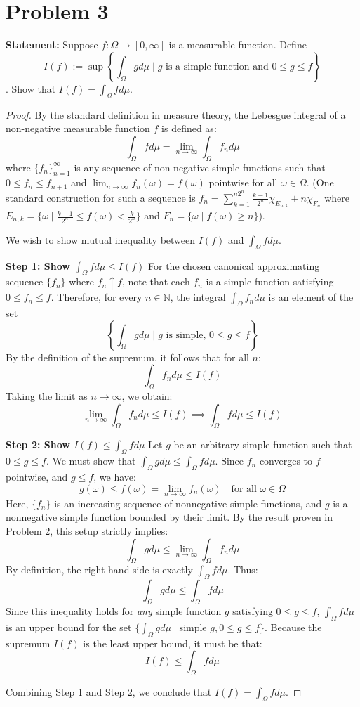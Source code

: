 \documentclass[12pt]{article}
\begin{document}
\section*{Problem 3}

\textbf{Statement:} Suppose $f: \Omega \rightarrow [0, \infty]$ is a measurable function. Define
$$ I(f) := \sup\left\{\int_{\Omega} g d\mu \mid g \text{ is a simple function and } 0 \le g \le f\right\} $$.
Show that $I(f) = \int_{\Omega} f d\mu$.

\begin{proof}
By the standard definition in measure theory, the Lebesgue integral of a non-negative measurable function $f$ is defined as:
$$ \int_{\Omega} f d\mu = \lim_{n \to \infty} \int_{\Omega} f_n d\mu $$
where $\{f_n\}_{n=1}^{\infty}$ is any sequence of non-negative simple functions such that $0 \le f_n \le f_{n+1}$ and $\lim_{n \to \infty} f_n(\omega) = f(\omega)$ pointwise for all $\omega \in \Omega$. 
(One standard construction for such a sequence is $f_n = \sum_{k=1}^{n 2^n} \frac{k-1}{2^n} \chi_{E_{n,k}} + n \chi_{F_n}$ where $E_{n,k} = \{ \omega \mid \frac{k-1}{2^n} \le f(\omega) < \frac{k}{2^n} \}$ and $F_n = \{ \omega \mid f(\omega) \ge n \}$).

We wish to show mutual inequality between $I(f)$ and $\int_{\Omega} f d\mu$.

\textbf{Step 1: Show $\int_{\Omega} f d\mu \le I(f)$}
For the chosen canonical approximating sequence $\{f_n\}$ where $f_n \uparrow f$, note that each $f_n$ is a simple function satisfying $0 \le f_n \le f$. 
Therefore, for every $n \in \mathbb{N}$, the integral $\int_{\Omega} f_n d\mu$ is an element of the set 
$$ \left\{ \int_{\Omega} g d\mu \mid g \text{ is simple, } 0 \le g \le f \right\} $$
By the definition of the supremum, it follows that for all $n$:
$$ \int_{\Omega} f_n d\mu \le I(f) $$
Taking the limit as $n \to \infty$, we obtain:
$$ \lim_{n \to \infty} \int_{\Omega} f_n d\mu \le I(f) \implies \int_{\Omega} f d\mu \le I(f) $$

\textbf{Step 2: Show $I(f) \le \int_{\Omega} f d\mu$}
Let $g$ be an arbitrary simple function such that $0 \le g \le f$. We must show that $\int_{\Omega} g d\mu \le \int_{\Omega} f d\mu$.
Since $f_n$ converges to $f$ pointwise, and $g \le f$, we have:
$$ g(\omega) \le f(\omega) = \lim_{n \to \infty} f_n(\omega) \quad \text{for all } \omega \in \Omega $$
Here, $\{f_n\}$ is an increasing sequence of nonnegative simple functions, and $g$ is a nonnegative simple function bounded by their limit. By the result proven in Problem 2, this setup strictly implies:
$$ \int_{\Omega} g d\mu \le \lim_{n \to \infty} \int_{\Omega} f_n d\mu $$
By definition, the right-hand side is exactly $\int_{\Omega} f d\mu$. Thus:
$$ \int_{\Omega} g d\mu \le \int_{\Omega} f d\mu $$
Since this inequality holds for \textit{any} simple function $g$ satisfying $0 \le g \le f$, $\int_{\Omega} f d\mu$ is an upper bound for the set $\{ \int_{\Omega} g d\mu \mid \text{simple } g, 0 \le g \le f \}$. Because the supremum $I(f)$ is the least upper bound, it must be that:
$$ I(f) \le \int_{\Omega} f d\mu $$

Combining Step 1 and Step 2, we conclude that $I(f) = \int_{\Omega} f d\mu$.
\end{proof}
\end{document}
